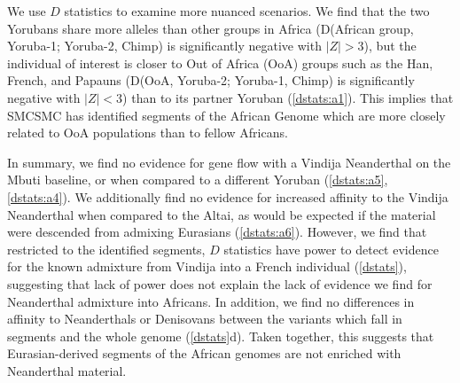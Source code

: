 We use $D$ statistics to examine more nuanced scenarios. We find that the two Yorubans share more alleles than other groups in Africa (D(African group, Yoruba-1; Yoruba-2, Chimp) is significantly negative with $|Z|>3$), but the individual of interest is closer to Out of Africa (OoA) groups such as the Han, French, and Papauns (D(OoA, Yoruba-2; Yoruba-1, Chimp) is significantly negative with $|Z|<3$) than to its partner Yoruban (\autoref{dstats:a1}). This implies that SMCSMC has identified segments of the African Genome which are more closely related to OoA populations than to fellow Africans.   


In summary, we find no evidence for gene flow with a Vindija Neanderthal on the Mbuti baseline, or when compared to a different Yoruban (\autoref{dstats:a5}, \autoref{dstats:a4}). We additionally find no evidence for increased affinity to the Vindija Neanderthal when compared to the Altai, as would be expected if the material were descended from admixing Eurasians (\autoref{dstats:a6}). However, we find that restricted to the identified segments, $D$ statistics have power to detect evidence for the known admixture from Vindija into a French individual (\autoref{dstats}), suggesting that lack of power does not explain the lack of evidence we find for Neanderthal admixture into Africans.  In addition, we find no differences in affinity to Neanderthals or Denisovans between the variants which fall in segments and the whole genome (\autoref{dstats}d). Taken together, this suggests that Eurasian-derived segments of the African genomes are not enriched with Neanderthal material.


